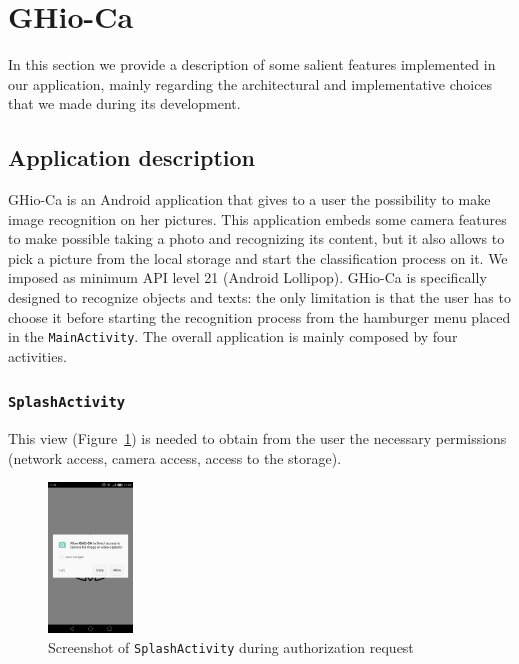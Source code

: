 \section{GHio-Ca}
\label{sec:ghioca}
In this section we provide a description of some salient features implemented 
in our application, mainly regarding the architectural and implementative choices 
that we made during its development.

\subsection{Application description}
GHio-Ca is an Android application that gives to a user the possibility to make
image recognition on her pictures. This application embeds some camera features
to make possible taking a photo and recognizing its content, but it also allows
to pick a picture from the local storage and start the classification process
on it. We imposed as minimum API level 21 (Android Lollipop).
GHio-Ca is specifically designed to recognize objects and texts: the only
limitation is that the user has to choose it before starting the recognition
process from the hamburger menu placed in the \texttt{MainActivity}.
The overall application is mainly composed by four activities.

\subsubsection{\texttt{SplashActivity}}
This view (Figure~\ref{fig:splash}) is needed to obtain from the user
the necessary permissions (network access, camera access, access to  the
storage).
\begin{figure}[h]
    \centering
    \includegraphics[width=0.2\textwidth]{../img/splash}
    \caption{Screenshot of \texttt{SplashActivity} during authorization request}
    \label{fig:splash}
\end{figure}


